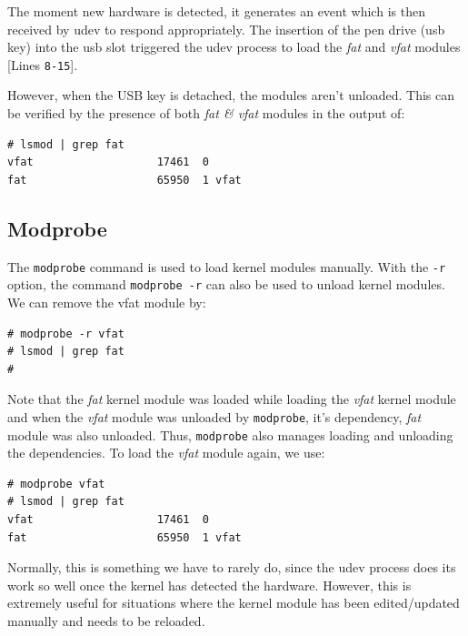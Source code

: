 \noindent
The moment new hardware is detected, it generates an event which is then received by udev to respond appropriately. The insertion of the pen drive (usb key) into the usb slot triggered the udev process to load the \textit{fat} and \textit{vfat} modules [Lines \verb|8-15|].

However, when the USB key is detached, the modules aren't unloaded. This can be verified by the presence of both \textit{fat \& vfat} modules in the output of:

\vspace{-15pt}
\begin{verbatim}
# lsmod | grep fat
vfat                   17461  0 
fat                    65950  1 vfat
\end{verbatim}
\vspace{-10pt}	

\subsection{Modprobe}
\vspace{-5pt}
The \verb|modprobe| command is used to load kernel modules  manually. With the \verb|-r| option, the command \verb|modprobe -r| can also be used to unload kernel modules. We can remove the vfat module by:

\vspace{-15pt}
\begin{verbatim}
# modprobe -r vfat
# lsmod | grep fat
# 
\end{verbatim}
\vspace{-10pt}	

\noindent
Note that the \textit{fat} kernel module was loaded while loading the \textit{vfat} kernel module and when the \textit{vfat} module was unloaded by \verb|modprobe|, it's dependency, \textit{fat} module was also unloaded. Thus, \verb|modprobe| also manages loading and unloading the dependencies. To load the \textit{vfat} module again, we use:

\vspace{-15pt}
\begin{verbatim}
# modprobe vfat
# lsmod | grep fat
vfat                   17461  0 
fat                    65950  1 vfat
\end{verbatim}
\vspace{-10pt}

\noindent
Normally, this is something we have to rarely do, since the udev process does its work so well once the kernel has detected the hardware. However, this is extremely useful for situations where the kernel module has been edited/updated manually and needs to be reloaded. 

